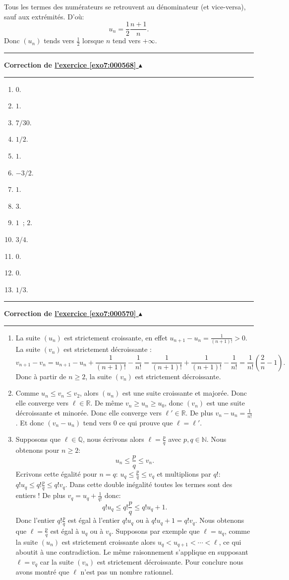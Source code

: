 \documentclass[11pt,a4paper]{article}
\newcommand{\Nn}{\mathbb{N}} \newcommand{\N}{\mathbb{N}}
\newcommand{\Qq}{\mathbb{Q}} \newcommand{\Q}{\mathbb{Q}}
\newcommand{\Rr}{\mathbb{R}} \newcommand{\R}{\mathbb{R}}
\newcounter{exo}
\newcommand{\correction}[1]{\hypertarget{cor7:#1}{}\label{cor7:#1}{\bf Correction de \hyperlink{exo7:#1}{l'exercice \ref{exo7:#1} $\blacktriangle$}}\vspace{1mm}\hrule\vspace{1mm}}
\newcommand{\fincorrection}{\vspace{1mm}\hrule\vspace*{7mm}}
\begin{document}
Tous les termes des num\'erateurs se retrouvent au d\'enominateur (et vice-versa), sauf aux extr\'emit\'es. D'o\`u:
$$u_n = \frac12\frac{n+1}{n}.$$
Donc $(u_n)$ tends vers $\frac12$ lorsque $n$ tend vers $+\infty$.
\fincorrection
\correction{000568}
\begin{enumerate}
  \item $0$.
  \item $1$.
  \item $7/30$.
  \item $1/2$.
  \item $1$.
  \item $-3/2$.
  \item $1$.
  \item $3$.
  \item $1$~; $2$.
  \item $3/4$.
  \item $0$.
  \item $0$.
  \item $1/3$.
\end{enumerate}
\fincorrection
\correction{000570}
\begin{enumerate}
  \item La suite $(u_n)$ est strictement croissante, en effet $u_{n+1}-u_n = \frac{1}{(n+1)!} > 0$. La suite $(v_n)$ est strictement d\'ecroissante :
$$v_{n+1}-v_n = u_{n+1}-u_n + \frac{1}{(n+1)!}-\frac{1}{n!}= \frac{1}{(n+1)!}+ \frac{1}{(n+1)!}-\frac{1}{n!}= \frac{1}{n!}(\frac 2n-1).$$
Donc \`a partir de $n\geq 2$, la suite $(v_n)$ est strictement d\'ecroissante.
  \item Comme $u_n \leq v_n \leq v_2$, alors $(u_n)$ est une suite croissante et major\'ee. Donc elle converge vers $\ell \in \Rr$.
De m\^eme $v_n \geq u_n \geq u_0$, donc  $(v_n)$ est une suite d\'ecroissante et minor\'ee. Donc elle converge vers $\ell' \in \Rr$.
De plus $v_n -u_n = \frac1{n!}$. Et donc $(v_n-u_n)$ tend vers $0$
ce qui prouve que $\ell=\ell'$.
  \item Supposons que $\ell \in \Qq$, nous \'ecrivons alors $\ell = \frac pq$ avec $p,q \in \Nn$. Nous obtenons pour $n\geq 2$:
$$u_n \leq \frac pq \leq v_n.$$
Ecrivons cette \'egalit\'e pour $n=q$: 
$u_q \leq \frac pq \leq v_q$ et multiplions par $q!$:
$q! u_q \leq q!\frac pq \leq q! v_q$. Dans cette double in\'egalit\'e toutes les termes sont des entiers ! De plus $v_q = u_q +\frac 1{q!}$ donc:
$$q! u_q \leq q! \frac pq \leq q! u_q + 1.$$
Donc l'entier $q! \frac pq$ est \'egal \`a l'entier $q! u_q$
ou \`a $q! u_q + 1 = q! v_q$. Nous obtenons que $\ell = \frac pq$
est \'egal \`a $u_q$ ou \`a $v_q$. Supposons par exemple que $\ell = u_q$,
comme la suite $(u_n)$ est strictement croissante alors $u_q  < u_{q+1} < \cdots < \ell$, ce qui aboutit \`a une contradiction. Le m\^eme raisonnement s'applique en supposant $\ell = v_q$ car la suite $(v_n)$ est strictement d\'ecroissante. Pour conclure nous avons montré que $\ell$ n'est pas un nombre rationnel.
\end{enumerate}
\end{document}
